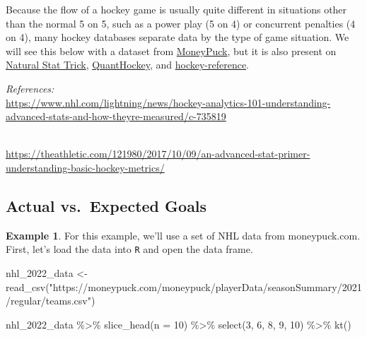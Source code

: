 \documentclass[
  11pt,
]{book}
\newenvironment{Shaded}{\begin{snugshade}}{\end{snugshade}}
\newcommand{\AttributeTok}[1]{\textcolor[rgb]{0.77,0.63,0.00}{#1}}
\newcommand{\DecValTok}[1]{\textcolor[rgb]{0.00,0.00,0.81}{#1}}
\newcommand{\FunctionTok}[1]{\textcolor[rgb]{0.00,0.00,0.00}{#1}}
\newcommand{\NormalTok}[1]{#1}
\newcommand{\OtherTok}[1]{\textcolor[rgb]{0.56,0.35,0.01}{#1}}
\newcommand{\SpecialCharTok}[1]{\textcolor[rgb]{0.00,0.00,0.00}{#1}}
\newcommand{\StringTok}[1]{\textcolor[rgb]{0.31,0.60,0.02}{#1}}
\theoremstyle{definition}
\theoremstyle{definition}
\newtheorem{example}{Example}[chapter]
\theoremstyle{definition}
\theoremstyle{definition}
\theoremstyle{remark}
\begin{document}
Because the flow of a hockey game is usually quite different in situations other than the normal 5 on 5, such as a power play (5 on 4) or concurrent penalties (4 on 4), many hockey databases separate data by the type of game situation. We will see this below with a dataset from \href{www.moneypuck.com}{MoneyPuck}, but it is also present on \href{https://www.naturalstattrick.com/}{Natural Stat Trick}, \href{www.quanthockey.com}{QuantHockey}, and \href{www.hockey-reference.com}{hockey-reference}.

\emph{References:}\\
\url{https://www.nhl.com/lightning/news/hockey-analytics-101-understanding-advanced-stats-and-how-theyre-measured/c-735819}\strut \\
\url{https://theathletic.com/121980/2017/10/09/an-advanced-stat-primer-understanding-basic-hockey-metrics/}

\hypertarget{actual-vs.-expected-goals}{%
\subsection{Actual vs.~Expected Goals}\label{actual-vs.-expected-goals}}

\begin{example}
For this example, we'll use a set of NHL data from moneypuck.com. First, let's load the data into \texttt{R} and open the data frame.
\end{example}

\begin{Shaded}
\begin{Highlighting}[]
\NormalTok{nhl\_2022\_data }\OtherTok{\textless{}{-}} \FunctionTok{read\_csv}\NormalTok{(}\StringTok{"https://moneypuck.com/moneypuck/playerData/seasonSummary/2021/regular/teams.csv"}\NormalTok{)}

\NormalTok{nhl\_2022\_data }\SpecialCharTok{\%\textgreater{}\%}
    \FunctionTok{slice\_head}\NormalTok{(}\AttributeTok{n =} \DecValTok{10}\NormalTok{) }\SpecialCharTok{\%\textgreater{}\%}
    \FunctionTok{select}\NormalTok{(}\DecValTok{3}\NormalTok{, }\DecValTok{6}\NormalTok{, }\DecValTok{8}\NormalTok{, }\DecValTok{9}\NormalTok{, }\DecValTok{10}\NormalTok{) }\SpecialCharTok{\%\textgreater{}\%}
    \FunctionTok{kt}\NormalTok{()}
\end{Highlighting}
\end{Shaded}
\end{document}
